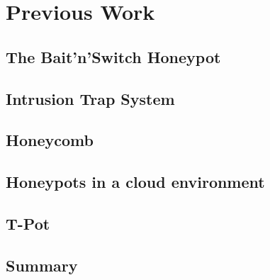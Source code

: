 \chapter{Previous Work}

\section{The Bait'n'Switch Honeypot}

\cite{Diebold2005}

\section{Intrusion Trap System}

\cite{Diebold2005}

\section{Honeycomb}

\cite{Diebold2005}

\section{Honeypots in a cloud environment}

\cite{Kelly2021}

\section{T-Pot}

\section{Summary}